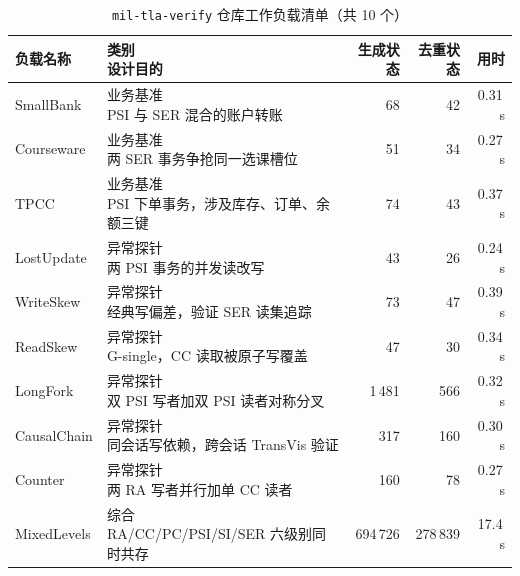 \begin{table}[htbp]
    \centering
    \caption{\texttt{mil-tla-verify} 仓库工作负载清单（共 10 个）}
    \label{tab:tla-workloads-summary}
    \small
    \renewcommand{\arraystretch}{1.15}
    \setlength{\tabcolsep}{6pt}
    \begin{tabular}{llrrr}
        \toprule
        负载名称        & \makecell[l]{类别   \\ 设计目的} & 生成状态 & 去重状态 & 用时 \\
        \midrule
        SmallBank   & \makecell[l]{业务基准 \\ PSI 与 SER 混合的账户转账}             & 68       & 42       & 0.31\,s \\[8pt]
        Courseware  & \makecell[l]{业务基准 \\ 两 SER 事务争抢同一选课槽位}           & 51       & 34       & 0.27\,s \\[8pt]
        TPCC        & \makecell[l]{业务基准 \\ PSI 下单事务，涉及库存、订单、余额三键} & 74       & 43       & 0.37\,s \\[8pt]
        LostUpdate  & \makecell[l]{异常探针 \\ 两 PSI 事务的并发读改写}                & 43       & 26       & 0.24\,s \\[8pt]
        WriteSkew   & \makecell[l]{异常探针 \\ 经典写偏差，验证 SER 读集追踪}          & 73       & 47       & 0.39\,s \\[8pt]
        ReadSkew    & \makecell[l]{异常探针 \\ G-single，CC 读取被原子写覆盖}         & 47       & 30       & 0.34\,s \\[8pt]
        LongFork    & \makecell[l]{异常探针 \\ 双 PSI 写者加双 PSI 读者对称分叉}      & 1\,481   & 566      & 0.32\,s \\[8pt]
        CausalChain & \makecell[l]{异常探针 \\ 同会话写依赖，跨会话 TransVis 验证}    & 317      & 160      & 0.30\,s \\[8pt]
        Counter     & \makecell[l]{异常探针 \\ 两 RA 写者并行加单 CC 读者}            & 160      & 78       & 0.27\,s \\[8pt]
        MixedLevels & \makecell[l]{综合   \\ RA/CC/PC/PSI/SI/SER 六级别同时共存}       & 694\,726 & 278\,839 & 17.4\,s \\
        \bottomrule
    \end{tabular}
\end{table}

